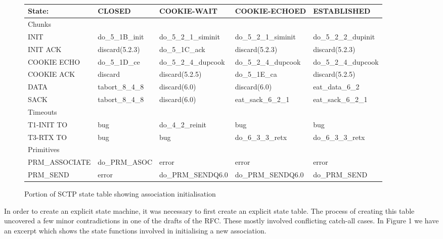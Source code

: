 \documentclass[twocolumn]{article}
\begin{document}
\begin{figure*}[t]
\begin{center}
{\tt
\begin{tabular}{ l  l  l  l  l }
   \hline
   \textnormal{State:}	& CLOSED	& COOKIE-WAIT	& COOKIE-ECHOED	& ESTABLISHED \\
   \hline
   \hline
   \textnormal{Chunks}	&		&		&		& \\
   \hline

   INIT         & do\_5\_1B\_init & do\_5\_2\_1\_siminit & do\_5\_2\_1\_siminit & do\_5\_2\_2\_dupinit \\
   INIT ACK     & discard(5.2.3) & do\_5\_1C\_ack	& discard(5.2.3) & discard(5.2.3)	\\
   COOKIE ECHO	& do\_5\_1D\_ce	& do\_5\_2\_4\_dupcook& do\_5\_2\_4\_dupcook& do\_5\_2\_4\_dupcook \\
   COOKIE ACK	& discard	& discard(5.2.5) & do\_5\_1E\_ca & discard(5.2.5)    		\\
   DATA		& tabort\_8\_4\_8 & discard(6.0) & discard(6.0) & eat\_data\_6\_2		\\
   SACK		& tabort\_8\_4\_8 & discard(6.0) & eat\_sack\_6\_2\_1 & eat\_sack\_6\_2\_1      \\

   \hline
   \textnormal{Timeouts} &	&		&		& \\
   \hline

   T1-INIT TO	& bug           & do\_4\_2\_reinit & bug	& bug \\
   T3-RTX TO	& bug           & bug		& do\_6\_3\_3\_retx & do\_6\_3\_3\_retx \\

   \hline
   \textnormal{Primitives} &	&		&		& \\
   \hline

   PRM\_ASSOCIATE & do\_PRM\_ASOC & error	& error		& error \\
   PRM\_SEND	& error		& do\_PRM\_SENDQ6.0 & do\_PRM\_SENDQ6.0 & do\_PRM\_SEND \\

\end{tabular}
}
\end{center}
\caption{\label{states}Portion of SCTP state table showing association initialisation}
\end{figure*}

In order to create an explicit state machine, it was necessary to
first create an explicit state table.  The process of creating this
table uncovered a few minor contradictions in one of the drafts of the 
RFC.  These mostly involved conflicting catch-all cases.  In Figure 1
we have an excerpt which shows the state functions involved in
initialising a new association.
\end{document}
